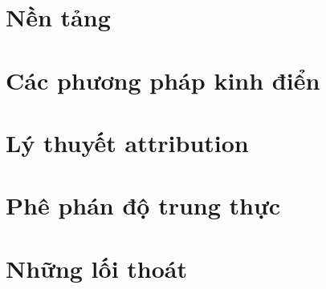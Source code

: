 \documentclass[11pt,a4paper,twoside,openright]{book}
\begin{document}
\frontmatter


\tableofcontents


\mainmatter

\part{Nền tảng}



\part{Các phương pháp kinh điển}




\part{Lý thuyết attribution}



\part{Phê phán độ trung thực}








\part{Những lối thoát}





\appendix





\backmatter
\printbibliography[heading=bibintoc]
\printindex
\end{document}

